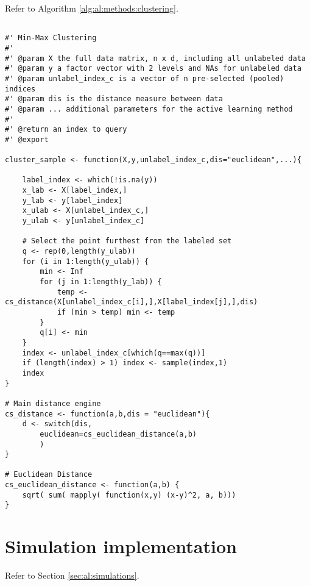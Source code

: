 Refer to Algorithm \ref{alg:al:methods:clustering}. 
{
\begin{lstlisting}

#' Min-Max Clustering
#'
#' @param X the full data matrix, n x d, including all unlabeled data
#' @param y a factor vector with 2 levels and NAs for unlabeled data
#' @param unlabel_index_c is a vector of n pre-selected (pooled) indices
#' @param dis is the distance measure between data
#' @param ... additional parameters for the active learning method
#'
#' @return an index to query
#' @export

cluster_sample <- function(X,y,unlabel_index_c,dis="euclidean",...){

	label_index <- which(!is.na(y))
	x_lab <- X[label_index,]
	y_lab <- y[label_index]
	x_ulab <- X[unlabel_index_c,]
	y_ulab <- y[unlabel_index_c]
	
	# Select the point furthest from the labeled set
	q <- rep(0,length(y_ulab))
	for (i in 1:length(y_ulab)) {
		min <- Inf
		for (j in 1:length(y_lab)) {
			temp <- cs_distance(X[unlabel_index_c[i],],X[label_index[j],],dis)
			if (min > temp) min <- temp
		}
		q[i] <- min
	}
	index <- unlabel_index_c[which(q==max(q))]
	if (length(index) > 1) index <- sample(index,1)
	index
}

# Main distance engine
cs_distance <- function(a,b,dis = "euclidean"){
	d <- switch(dis,
		euclidean=cs_euclidean_distance(a,b)
		)
}

# Euclidean Distance
cs_euclidean_distance <- function(a,b) {
	sqrt( sum( mapply( function(x,y) (x-y)^2, a, b)))
}
\end{lstlisting}
}

\section{Simulation implementation}
\label{sec:appendicies:al:simulations}

Refer to Section \ref{sec:al:simulations}.
